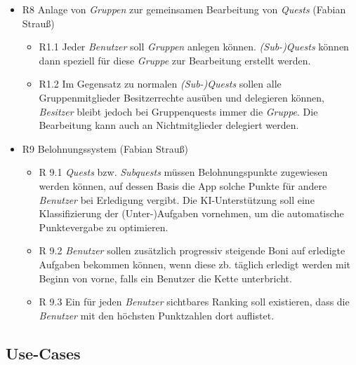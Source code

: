\documentclass{article}
\begin{document}
\begin{itemize}
\begin{itemize}
\item R8 Anlage von \textit{Gruppen} zur gemeinsamen Bearbeitung von \textit{Quests} (Fabian Strauß)
    \begin{itemize}
        \item R1.1 Jeder \textit{Benutzer} soll \textit{Gruppen} anlegen können. \textit{(Sub-)Quests} können dann speziell für diese \textit{Gruppe} zur Bearbeitung erstellt werden.
	\item R1.2 Im Gegensatz zu normalen \textit{(Sub-)Quests} sollen alle Gruppenmitglieder Besitzerrechte ausüben und delegieren können, \textit{Besitzer} bleibt jedoch bei Gruppenquests immer die \textit{Gruppe}. Die Bearbeitung kann auch an Nichtmitglieder delegiert werden.
    \end{itemize}

    
\item R9 Belohnungssystem (Fabian Strauß)
    \begin{itemize}
        \item R 9.1 \textit{Quests} bzw. \textit{Subquests} müssen Belohnungspunkte zugewiesen werden können, auf dessen Basis die App solche Punkte für andere \textit{Benutzer} bei Erledigung vergibt. Die KI-Unterstützung soll eine Klassifizierung der (Unter-)Aufgaben vornehmen, um die automatische Punktevergabe zu optimieren.
        \item R 9.2 \textit{Benutzer} sollen zusätzlich progressiv steigende Boni auf erledigte Aufgaben bekommen können, wenn diese zb. täglich erledigt werden mit Beginn von vorne, falls ein Benutzer die Kette unterbricht.
        \item R 9.3 Ein für jeden \textit{Benutzer} sichtbares Ranking soll existieren, dass die \textit{Benutzer} mit den höchsten Punktzahlen dort auflistet.
    \end{itemize}

\end{itemize}
\end{itemize}
\subsection{Use-Cases}
\end{document}
